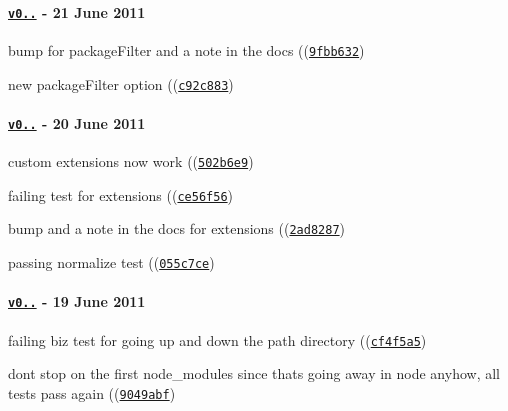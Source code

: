 \paragraph*{\href{https://github.com/browserify/resolve/compare/v0.0.3...v0.0.4}{\tt v0..} -\/ 21 June 2011}


\begin{DoxyItemize}
\item bump for package\+Filter and a note in the docs ((\href{https://github.com/browserify/resolve/commit/9fbb632a5c0c38641ed7c10399306a56651e0789}{\tt {\ttfamily 9fbb632}})
\item new package\+Filter option ((\href{https://github.com/browserify/resolve/commit/c92c883bed3e50dd8ed9a2e1d4b9fefc9f3ced64}{\tt {\ttfamily c92c883}})
\end{DoxyItemize}

\paragraph*{\href{https://github.com/browserify/resolve/compare/v0.0.2...v0.0.3}{\tt v0..} -\/ 20 June 2011}


\begin{DoxyItemize}
\item custom extensions now work ((\href{https://github.com/browserify/resolve/commit/502b6e9c8b9f258e5c943954467016e9c048fa0f}{\tt {\ttfamily 502b6e9}})
\item failing test for extensions ((\href{https://github.com/browserify/resolve/commit/ce56f56b4e1a5c1df495a7bf061fb0242103b4d8}{\tt {\ttfamily ce56f56}})
\item bump and a note in the docs for extensions ((\href{https://github.com/browserify/resolve/commit/2ad8287bc8b34929c2074a739410d08955ccdea7}{\tt {\ttfamily 2ad8287}})
\item passing normalize test ((\href{https://github.com/browserify/resolve/commit/055c7cea391ff0ce9cd8c585e8244f553b62f6e7}{\tt {\ttfamily 055c7ce}})
\end{DoxyItemize}

\paragraph*{\href{https://github.com/browserify/resolve/compare/v0.0.1...v0.0.2}{\tt v0..} -\/ 19 June 2011}


\begin{DoxyItemize}
\item failing biz test for going up and down the path directory ((\href{https://github.com/browserify/resolve/commit/cf4f5a58d092124c517c55dd180559f5a444eb06}{\tt {\ttfamily cf4f5a5}})
\item don\textquotesingle{}t stop on the first node\+\_\+modules since that\textquotesingle{}s going away in node anyhow, all tests pass again ((\href{https://github.com/browserify/resolve/commit/9049abfb60cac49bb547b8ca02cc2617d406ff1a}{\tt {\ttfamily 9049abf}})
\end{DoxyItemize}

